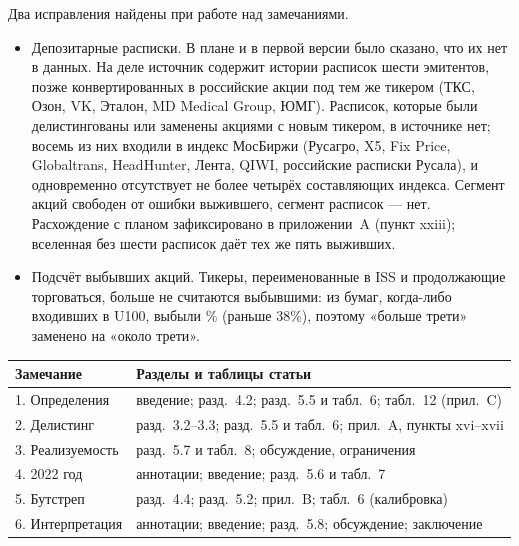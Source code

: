 \documentclass[11pt]{article}
\newcommand{\point}[1]{\par\vspace{10pt}{\large #1}\par\vspace{2pt}}
\begin{document}
\point{Дополнительные исправления}
Два исправления найдены при работе над замечаниями.
\begin{itemize}
\item Депозитарные расписки. В плане и в первой версии было сказано, что их нет в данных. На деле источник
содержит истории расписок шести эмитентов, позже конвертированных в российские акции под тем же тикером (ТКС, Озон,
VK, Эталон, MD Medical Group, ЮМГ). Расписок, которые были делистингованы или заменены акциями с новым тикером, в
источнике нет; восемь из них входили в индекс МосБиржи (Русагро, X5, Fix Price, Globaltrans, HeadHunter, Лента,
QIWI, российские расписки Русала), и одновременно отсутствует не более четырёх составляющих индекса.
Сегмент акций свободен от ошибки выжившего, сегмент расписок --- нет. Расхождение с планом зафиксировано в
приложении~A (пункт xxiii); вселенная без шести расписок даёт тех же пять выживших.
\item Подсчёт выбывших акций. Тикеры, переименованные в ISS и продолжающие торговаться, больше не считаются
выбывшими: из бумаг, когда-либо входивших в U100, выбыли \% (раньше 38\%), поэтому «больше
трети» заменено на «около трети».
\end{itemize}

\point{Где смотреть изменения}
\begin{tabularx}{\linewidth}{@{}lX@{}}
\toprule
Замечание & Разделы и таблицы статьи \\
\midrule
1. Определения & введение; разд.~4.2; разд.~5.5 и табл.~6; табл.~12 (прил.~C) \\
2. Делистинг & разд.~3.2--3.3; разд.~5.5 и табл.~6; прил.~A, пункты xvi--xvii \\
3. Реализуемость & разд.~5.7 и табл.~8; обсуждение, ограничения \\
4. 2022 год & аннотации; введение; разд.~5.6 и табл.~7 \\
5. Бутстреп & разд.~4.4; разд.~5.2; прил.~B; табл.~6 (калибровка) \\
6. Интерпретация & аннотации; введение; разд.~5.8; обсуждение; заключение \\
\bottomrule
\end{tabularx}
\end{document}
